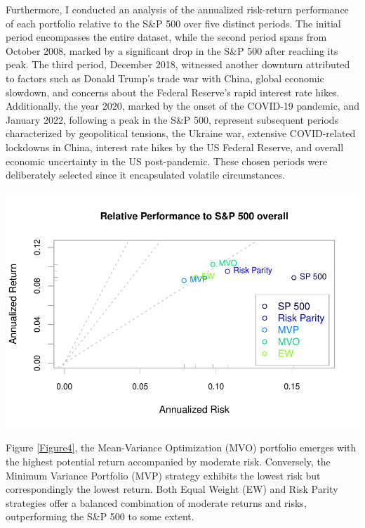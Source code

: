 \documentclass[12pt,preprint, authoryear]{elsarticle}
\let\origfigure\figure
\let\endorigfigure\endfigure
\renewenvironment{figure}[1][2] {
    \expandafter\origfigure\expandafter[H]
} {
    \endorigfigure
}
\numberwithin{equation}{section}
\numberwithin{figure}{section}
\numberwithin{table}{section}
\begin{document}
Furthermore, I conducted an analysis of the annualized risk-return
performance of each portfolio relative to the S\&P 500 over five
distinct periods. The initial period encompasses the entire dataset,
while the second period spans from October 2008, marked by a significant
drop in the S\&P 500 after reaching its peak. The third period, December
2018, witnessed another downturn attributed to factors such as Donald
Trump's trade war with China, global economic slowdown, and concerns
about the Federal Reserve's rapid interest rate hikes. Additionally, the
year 2020, marked by the onset of the COVID-19 pandemic, and January
2022, following a peak in the S\&P 500, represent subsequent periods
characterized by geopolitical tensions, the Ukraine war, extensive
COVID-related lockdowns in China, interest rate hikes by the US Federal
Reserve, and overall economic uncertainty in the US post-pandemic. These
chosen periods were deliberately selected since it encapsulated volatile
circumstances.

\begin{figure}[H]

{\centering \includegraphics{Finmetrics_Project_files/figure-latex/Figure4-1} 

}

\caption{Annualized Risk-Return performance of portfolios relative to SP 500 over the entire sample period. \label{Figure4}}\label{fig:Figure4}
\end{figure}

Figure \ref{Figure4}, the Mean-Variance Optimization (MVO) portfolio
emerges with the highest potential return accompanied by moderate risk.
Conversely, the Minimum Variance Portfolio (MVP) strategy exhibits the
lowest risk but correspondingly the lowest return. Both Equal Weight
(EW) and Risk Parity strategies offer a balanced combination of moderate
returns and risks, outperforming the S\&P 500 to some extent.
\end{document}
